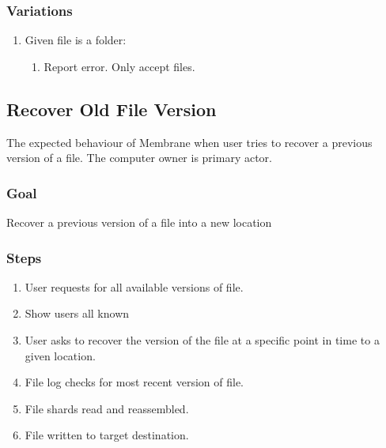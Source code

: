 \documentclass[11pt, a4paper, twocolumn, twoside]{report}
\begin{document}
\subsubsection{Variations}
\begin{enumerate}
  \item Given file is a folder:
	\begin{enumerate}
	  \item Report error. Only accept files.
	\end{enumerate}
\end{enumerate}

\subsection{Recover Old File Version}

The expected behaviour of Membrane when user tries to recover a previous version of a file. The computer owner is primary actor.

\subsubsection{Goal}

Recover a previous version of a file into a new location

\subsubsection{Steps}

\begin{enumerate}
 \item User requests for all available versions of file.
 \item Show users all known 
 \item User asks to recover the version of the file at a specific point in time to a given location.
 \item File log checks for most recent version of file.
 \item File shards read and reassembled.
 \item File written to target destination.
\end{enumerate}
\end{document}
